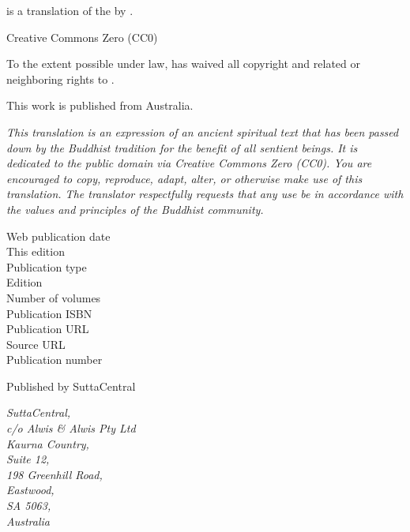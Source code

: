 
\begin{footnotesize}

\textit{} is a translation of the  by .

\medskip

Creative Commons Zero (CC0)

To the extent possible under law,  has waived all copyright and related or neighboring rights to \textit{}.

\medskip

This work is published from Australia.

\begin{center}
\textit{This translation is an expression of an ancient spiritual text that has been passed down by the Buddhist tradition for the benefit of all sentient beings. It is dedicated to the public domain via Creative Commons Zero (CC0). You are encouraged to copy, reproduce, adapt, alter, or otherwise make use of this translation. The translator respectfully requests that any use be in accordance with the values and principles of the Buddhist community.}
\end{center}

\medskip

\begin{description}
    \item[Web publication date] 
    \item[This edition] 
    \item[Publication type] 
    \item[Edition] 
    \item[Number of volumes] 
    \item[Publication ISBN] 
    \item[Publication URL] 
    \item[Source URL] 
    \item[Publication number] 
\end{description}

\medskip

Published by SuttaCentral

\medskip

\textit{SuttaCentral,\\
c/o Alwis \& Alwis Pty Ltd\\
Kaurna Country,\\
Suite 12,\\
198 Greenhill Road,\\
Eastwood,\\
SA 5063,\\
Australia}

\end{footnotesize}

\newpage

\setlength{\parindent}{1.5em}%